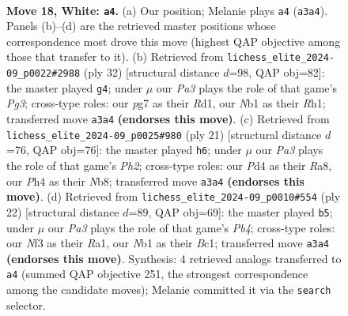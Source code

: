 \documentclass[11pt]{article}
\begin{document}
\begin{figure}[p]\centering
\begin{subfigure}{0.46\textwidth}\centering
\resizebox{\linewidth}{!}{%
\newchessgame
\chessboard[
  setfen={r1b1kr2/p3b1pp/1pnq4/3p1p1n/1p1P3P/P3PNPB/R3QP2/1NBR2K1 w - - 4 18},
  showmover=false,
  pgfstyle=straightmove, color=movearrow, markmove={a3-a4}
]}
\caption{}
\end{subfigure}\hfill
\begin{subfigure}{0.46\textwidth}\centering
\resizebox{\linewidth}{!}{%
\newchessgame
\chessboard[
  setfen={r1bq1r2/1pp3bk/6pp/2pPp2n/p1P1Pp2/2NB1NPP/PP1Q1P2/1K1R3R w - - 0 17},
  showmover=false,
  pgfstyle=straightmove, color=movearrow, markmove={g3-g4}
]}
\caption{}
\end{subfigure}
\\[4pt]
\begin{subfigure}{0.46\textwidth}\centering
\resizebox{\linewidth}{!}{%
\newchessgame
\chessboard[
  setfen={rn1qk2r/pb1pn1bp/1p4p1/5pN1/2PPp3/2N2PP1/PP4BP/R1BQ1RK1 b kq - 0 11},
  showmover=false,
  pgfstyle=straightmove, color=movearrow, markmove={h7-h6}
]}
\caption{}
\end{subfigure}\hfill
\begin{subfigure}{0.46\textwidth}\centering
\resizebox{\linewidth}{!}{%
\newchessgame
\chessboard[
  setfen={r1bqr1k1/1pp1bpp1/1nn4p/p3p3/1P6/P1NP1NP1/4PPBP/R1BQR1K1 w - - 0 12},
  showmover=false,
  pgfstyle=straightmove, color=movearrow, markmove={b4-b5}
]}
\caption{}
\end{subfigure}
\caption{\textbf{Move 18, White: \texttt{a4}.} (a) Our position; Melanie plays \texttt{a4} (\texttt{a3a4}). Panels (b)--(d) are the retrieved master positions whose correspondence most drove this move (highest QAP objective among those that transfer to it). (b) Retrieved from \texttt{lichess\_elite\_2024-09\_p0022\#2988} (ply 32) [structural distance $d$=98, QAP obj=82]: the master played \texttt{g4}; under $\mu$ our \emph{Pa3} plays the role of that game's \emph{Pg3}; cross-type roles: our \emph{p}g7 as their \emph{R}d1, our \emph{N}b1 as their \emph{R}h1; transferred move \texttt{a3a4} \textbf{(endorses this move)}. (c) Retrieved from \texttt{lichess\_elite\_2024-09\_p0025\#980} (ply 21) [structural distance $d$=76, QAP obj=76]: the master played \texttt{h6}; under $\mu$ our \emph{Pa3} plays the role of that game's \emph{Ph2}; cross-type roles: our \emph{P}d4 as their \emph{R}a8, our \emph{P}h4 as their \emph{N}b8; transferred move \texttt{a3a4} \textbf{(endorses this move)}. (d) Retrieved from \texttt{lichess\_elite\_2024-09\_p0010\#554} (ply 22) [structural distance $d$=89, QAP obj=69]: the master played \texttt{b5}; under $\mu$ our \emph{Pa3} plays the role of that game's \emph{Pb4}; cross-type roles: our \emph{N}f3 as their \emph{R}a1, our \emph{N}b1 as their \emph{B}c1; transferred move \texttt{a3a4} \textbf{(endorses this move)}. Synthesis: 4 retrieved analogs transferred to \texttt{a4} (summed QAP objective 251, the strongest correspondence among the candidate moves); Melanie committed it via the \texttt{search} selector.}
\label{fig:thought-m34}
\end{figure}
\end{document}
